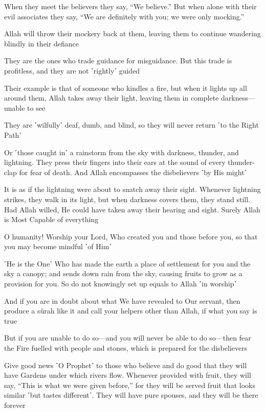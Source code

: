 When they meet the believers they say, “We believe.” But when alone with their evil associates they say, “We are definitely with you; we were only mocking.”

Allah will throw their mockery back at them, leaving them to continue wandering blindly in their defiance

They are the ones who trade guidance for misguidance. But this trade is profitless, and they are not ˹rightly˺ guided

Their example is that of someone who kindles a fire, but when it lights up all around them, Allah takes away their light, leaving them in complete darkness—unable to see

They are ˹wilfully˺ deaf, dumb, and blind, so they will never return ˹to the Right Path˺

Or ˹those caught in˺ a rainstorm from the sky with darkness, thunder, and lightning. They press their fingers into their ears at the sound of every thunder-clap for fear of death. And Allah encompasses the disbelievers ˹by His might˺

It is as if the lightning were about to snatch away their sight. Whenever lightning strikes, they walk in its light, but when darkness covers them, they stand still. Had Allah willed, He could have taken away their hearing and sight. Surely Allah is Most Capable of everything

O humanity! Worship your Lord, Who created you and those before you, so that you may become mindful ˹of Him˺

˹He is the One˺ Who has made the earth a place of settlement for you and the sky a canopy; and sends down rain from the sky, causing fruits to grow as a provision for you. So do not knowingly set up equals to Allah ˹in worship˺

And if you are in doubt about what We have revealed to Our servant, then produce a sûrah like it and call your helpers other than Allah, if what you say is true

But if you are unable to do so—and you will never be able to do so—then fear the Fire fuelled with people and stones, which is prepared for the disbelievers

Give good news ˹O Prophet˺ to those who believe and do good that they will have Gardens under which rivers flow. Whenever provided with fruit, they will say, “This is what we were given before,” for they will be served fruit that looks similar ˹but tastes different˺. They will have pure spouses, and they will be there forever


